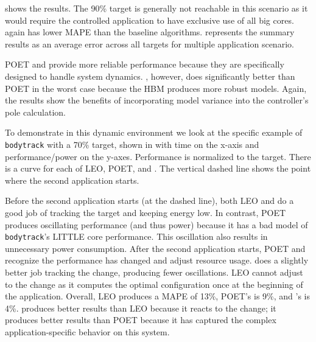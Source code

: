  shows the results.  The
90\% target is generally not reachable in this scenario as it would
require the controlled application to have exclusive use of all big
cores.  \SYSTEM{} again has lower MAPE than the baseline algorithms.
 represents the summary results as an average error across all targets for multiple application scenario.

POET and \SYSTEM{} provide more reliable performance because they are
specifically designed to handle system dynamics.  \SYSTEM{}, however,
does significantly better than POET in the worst case because the HBM
produces more robust models.  Again, the results show the benefits of
incorporating model variance into the controller's pole calculation.

To demonstrate \SYSTEM{} in this dynamic environment we look at the
specific example of \texttt{bodytrack} with a 70\% target, shown in
 with time on the x-axis and
performance/power on the y-axes.  Performance is normalized to the
target.  There is a curve for each of LEO, POET, and \SYSTEM{}. The
vertical dashed line shows the point where the second application
starts.


Before the second application starts (at the dashed line), both LEO
and \SYSTEM{} do a good job of tracking the target and keeping energy
low.  In contrast, POET produces oscillating performance (and thus
power) because it has a bad model of \texttt{bodytrack}'s LITTLE core
performance.  This oscillation also results in unnecessary power
consumption.  After the second application starts, POET and \SYSTEM{}
recognize the performance has changed and adjust resource usage.
\SYSTEM{} does a slightly better job tracking the change, producing
fewer oscillations.  LEO cannot adjust to the change as it computes
the optimal configuration once at the beginning of the application.
Overall, LEO produces a MAPE of 13\%, POET's is 9\%, and \SYSTEM{}'s
is 4\%.  \SYSTEM{} produces better results than LEO because it reacts
to the change; it produces better results than POET because it has
captured the complex application-specific behavior on this system.





